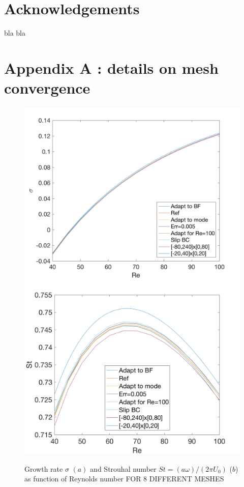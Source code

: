 \documentclass[twocolumn,10pt]{asme2ej}
\begin{document}
\section*{Acknowledgements}
bla bla

\section*{Appendix A : details on mesh convergence}
\begin{figure}
\includegraphics[width=.9 \linewidth]{Cylinder_Sigma_Re_TESTMESHES.png}
\includegraphics[width=.9 \linewidth]{Cylinder_Strouhal_Re_TESTMESHES.png}
\caption{Growth rate $\sigma$ $(a)$  and Strouhal number $St = (a \omega)/(2\pi U_0)$ ($b$) as function of Reynolds number FOR 8 DIFFERENT MESHES}
\label{fig:MeshConvergence}
\end{figure}
\end{document}
